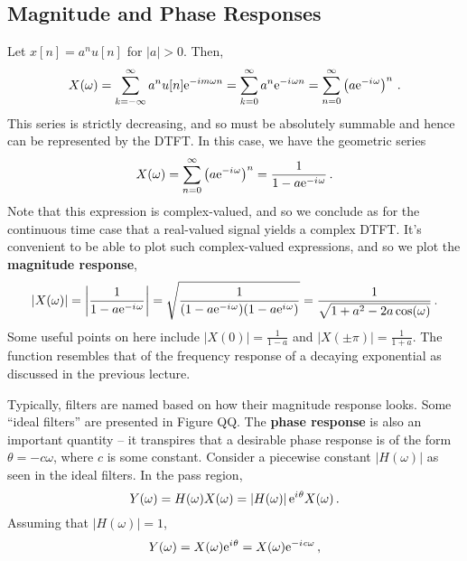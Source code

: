 \subsection{Magnitude and Phase Responses}
%
\begin{exmp}
  Let $x[n] = a^n u[n]$ for $|a|>0$. Then,
  \begin{displaymath}
    X(\omega) = \sum_{k=-\infty}^\infty a^n u[n]\mathrm{e}^{-im\omega n} = \sum_{k=0}^\infty a^n\mathrm{e}^{-{i\mkern1mu}\omega n}
    = \sum_{n=0}^\infty\left(a\mathrm{e}^{-{i\mkern1mu}\omega}\right)^n \,.
  \end{displaymath}
  This series is strictly decreasing, and so must be absolutely summable and
  hence can be represented by the DTFT. In this case, we have the geometric series
  \begin{displaymath}
    X(\omega) = \sum_{n=0}^\infty\left(a\mathrm{e}^{-{i\mkern1mu}\omega}\right)^n = \frac{1}{1-a\mathrm{e}^{-{i\mkern1mu}\omega}} \,.
  \end{displaymath}
  Note that this expression is complex-valued, and so we conclude as for the continuous
  time case that a real-valued signal yields a complex DTFT. It's convenient to be
  able to plot such complex-valued expressions, and so we plot the
  \textbf{magnitude response},
  \begin{displaymath}
    |X(\omega)| = \left|\frac{1}{1-a\mathrm{e}^{-{i\mkern1mu}\omega}}\right|
    = \sqrt{\frac{1}{(1-a\mathrm{e}^{-{i\mkern1mu}\omega})(1-a\mathrm{e}^{{i\mkern1mu}\omega})}}
    = \frac{1}{\sqrt{1 + a^2 - 2a\cos(\omega)}} \,.
  \end{displaymath}
  Some useful points on here include $|X(0)| = \frac{1}{1-a}$ and 
  $|X(\pm\pi)| = \frac{1}{1+a}$. The function resembles that of the frequency
  response of a decaying exponential as discussed in the previous lecture.
\end{exmp}
%
Typically, filters are named based on how their magnitude response looks. Some
``ideal filters'' are presented in Figure QQ.
%
The \textbf{phase response} is also an important quantity -- it transpires that
a desirable phase response is of the form $\theta = -c\omega$, where $c$ is some
constant. Consider a piecewise constant $\left|H(\omega)\right|$ as seen in
the ideal filters. In the pass region,
%
\begin{displaymath}
  Y(\omega) = H(\omega)X(\omega) = \left|H(\omega)\right|\mathrm{e}^{{i\mkern1mu}\theta}X(\omega) \,.
\end{displaymath}
%
Assuming that $|H(\omega)| = 1$,
%
\begin{displaymath}
  Y(\omega) = X(\omega)\mathrm{e}^{{i\mkern1mu}\theta} = X(\omega)\mathrm{e}^{-{i\mkern1mu} c\omega} \,,
\end{displaymath}
